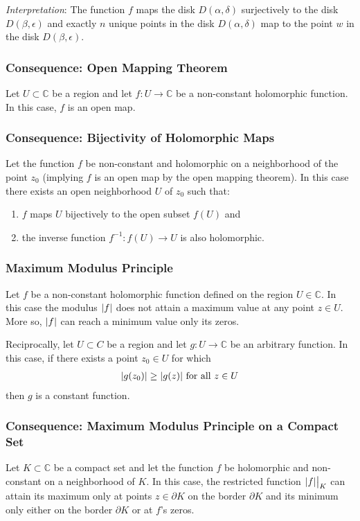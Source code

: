 \documentclass[11pt, a4paper]{article}
\newcommand{\C}{\mathbb{C}} %
\begin{document}
\textit{Interpretation}: The function $ f $ maps the disk $ D(\alpha, \delta) $ surjectively to the disk $ D(\beta, \epsilon) $ and exactly $ n $ unique points in the disk $ D(\alpha, \delta) $ map to the point $ w $ in the disk $ D(\beta, \epsilon) $.

\subsubsection{Consequence: Open Mapping Theorem}
Let $ U \subset  \C$ be a region and let $ f : U \to \C $ be a non-constant holomorphic function. In this case, $ f $ is an open map.

\subsubsection{Consequence: Bijectivity of Holomorphic Maps}
Let the function $ f $ be non-constant and holomorphic on a neighborhood of the point $ z_0 $ (implying $ f $ is an open map by the open mapping theorem). In this case there exists an open neighborhood $ U $ of $ z_0 $ such that:
\begin{enumerate}
	\item $ f $ maps $ U $ bijectively to the open subset $ f(U) $ and
	\item the inverse function $ f^{-1}: f(U) \to U $ is also holomorphic.
\end{enumerate}

\subsubsection{Maximum Modulus Principle}
Let $ f $ be a non-constant holomorphic function defined on the region $ U \in \C $. In this case the modulus $ \abs{f} $ does not attain a maximum value at any point $ z \in U $. More so, $ \abs{f} $ can reach a minimum value only its zeros.

Reciprocally, let $ U \subset C $ be a region and let $ g:U\to \C $ be an arbitrary function. In this case, if there exists a point $ z_0 \in U $ for which 
\begin{align*}
	\abs{g(z_0)} \geq \abs{g(z)} \ \text{for all} \ z \in U
\end{align*}
then $ g $ is a constant function.

\subsubsection{Consequence: Maximum Modulus Principle on a Compact Set}
Let $ K \subset \C $ be a compact set and let the function $ f $ be holomorphic and non-constant on a neighborhood of $ K $. In this case, the restricted function $ \abs{f} \big |_{K} $ can attain its maximum only at points $ z \in \partial K $ on the border $ \partial K $ and its minimum only either on the border $ \partial K $ or at $ f $'s zeros.
\end{document}
